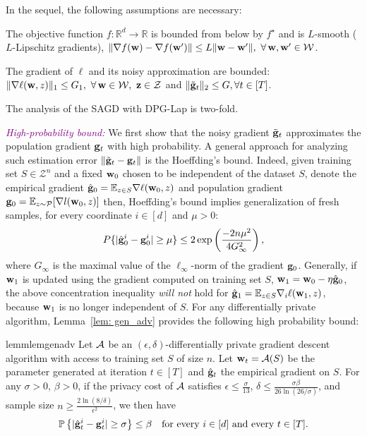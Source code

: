 \documentclass[11pt]{article}
\begin{document}
In the sequel, the following assumptions are necessary:
\begin{assumption}
The objective function $ f: \mathbb{R}^d \rightarrow \mathbb{R}$ is bounded from below by $f^\star$ and is $L$-smooth ($L$-Lipschitz gradients), \ie$\nr \|\nabla f(\w) -\nabla f(\w^\prime) \|\leq L \|\w-\w^\prime \|, ~ \forall\, \w, \w^\prime \in \cW$.
\end{assumption}
\begin{assumption}
The gradient of $\ell$ and its noisy approximation are bounded: $\|\nabla \ell (\w, z) \|_1 \leq G_1, \ \forall\,\w \in \cW, \  \z \in \cZ$ and $\|\tilde {\mathbf{g}}_t\|_2 \leq G, \forall t \in [T]$.
\end{assumption}
The analysis of the \textsc{SAGD} with DPG-Lap is two-fold.

\textcolor{purple}{\textit{High-probability bound:}}
We first show that the noisy gradient $\tilde {\mathbf{g}}_t$ approximates the population gradient $\mathbf{g}_t$ with high probability.
A general approach for analyzing such estimation error $\| \tilde {\mathbf{g}}_t - \mathbf{g}_t\|$ is the Hoeffding's bound. 
Indeed, given training set $S \in \mathcal{Z}^n$ and a fixed $\mathbf{w}_0$ chosen to be independent of the dataset $S$, denote the empirical gradient $\hat {\mathbf{g}}_0= \mathbb{E}_{z \in S}\nabla \ell(\mathbf{w}_0,z)$ and population gradient $\mathbf{g}_0 = \mathbb{E}_{z\sim \mathcal{P}}[\nabla l(\mathbf{w}_0,z)]$ then, Hoeffding's bound implies generalization of fresh samples, \ie for every coordinate $i \in [d]$ and $\mu > 0$:
\begin{equation} \label{hoeffding}
P\{|\hat {\mathbf{g}}^i_0 - \mathbf{g}_0^i | \geq \mu \} \leq2 \exp \left(\frac{-2n\mu^2}{4G_\infty^2} \right),
\end{equation}
 where $G_\infty$ is the maximal value of the $\ell_\infty$-norm of the gradient $ \mathbf{g}_0$. 
Generally, if $\mathbf{w}_1$ is updated using the gradient computed on training set $S$, \ie $\mathbf{w}_1 = \mathbf{w}_0 - \eta \hat {\mathbf{g}}_0$, the above concentration inequality \emph{will not} hold for $\hat {\mathbf{g}}_1 = \mathbb{E}_{z \in S}\nabla_i \ell(\mathbf{w}_1,z)$, because $\mathbf{w}_1$ is no longer independent of $S$. 
For any differentially private algorithm, Lemma~\ref{lem: gen_adv} provides the following high probability bound:  
\begin{restatable}{lemm}{lemgenadv}
\label{lem: gen_adv}
	Let $\cA$ be an $(\epsilon, \delta)$-differentially private gradient descent algorithm with access to training set $S$ of size $n$. Let $\w_t = \cA(S)$ be the parameter generated at iteration $t \in [T]$ and $\hat {\mathbf{g}}_t$ the empirical gradient on $S$. For any $\sigma >0$, $\beta > 0$, if the privacy cost of $\cA$ satisfies $\epsilon \leq \frac{\sigma}{13}$, $\delta \leq \frac{\sigma \beta}{26 \ln(26/\sigma)}$, and sample size $n \geq \frac{2\ln(8/\delta)}{\epsilon^2}$, we then have
	\begin{equation*}
	\mathbb{P}\left\{ |\hat {\mathbf{g}}_t^i - \mathbf{g}_t^i| \geq  \sigma \right\} \leq \beta \quad \textrm{for every $ i\in [d]$ and every $t \in [T]$} .
	\end{equation*} 
\end{restatable}
\end{document}
